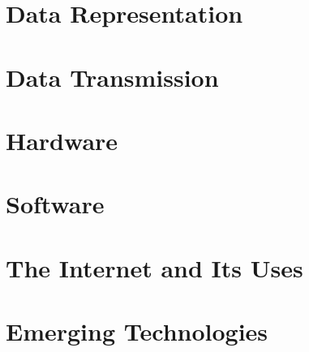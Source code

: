 \documentclass[a4paper, oneside, 11pt]{book} %
\begin{document}
\chapter{Data Representation}


\chapter{Data Transmission}


\chapter{Hardware}


\chapter{Software}


\chapter{The Internet and Its Uses}


\chapter{Emerging Technologies}

\end{document}
